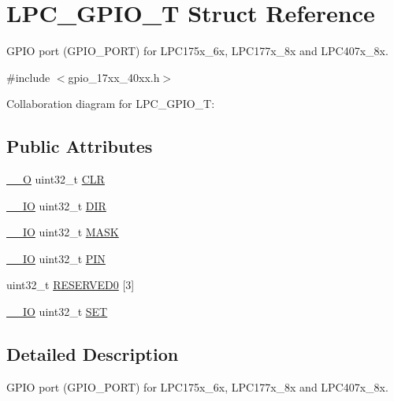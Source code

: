 \hypertarget{structLPC__GPIO__T}{}\section{L\+P\+C\+\_\+\+G\+P\+I\+O\+\_\+T Struct Reference}
\label{structLPC__GPIO__T}


G\+P\+IO port (G\+P\+I\+O\+\_\+\+P\+O\+RT) for L\+P\+C175x\+\_\+6x, L\+P\+C177x\+\_\+8x and L\+P\+C407x\+\_\+8x.  




{\ttfamily \#include $<$gpio\+\_\+17xx\+\_\+40xx.\+h$>$}



Collaboration diagram for L\+P\+C\+\_\+\+G\+P\+I\+O\+\_\+T\+:
\subsection*{Public Attributes}
\begin{DoxyCompactItemize}
\item 
\hyperlink{core__cm3_8h_a7e25d9380f9ef903923964322e71f2f6}{\+\_\+\+\_\+O} uint32\+\_\+t \hyperlink{structLPC__GPIO__T_aba8161f685588a1ca79702207083e6ab}{C\+LR}
\item 
\hyperlink{core__cm3_8h_aec43007d9998a0a0e01faede4133d6be}{\+\_\+\+\_\+\+IO} uint32\+\_\+t \hyperlink{structLPC__GPIO__T_a753957fa7e1c261e57255c1db8d62bb7}{D\+IR}
\item 
\hyperlink{core__cm3_8h_aec43007d9998a0a0e01faede4133d6be}{\+\_\+\+\_\+\+IO} uint32\+\_\+t \hyperlink{structLPC__GPIO__T_a5b0ae096141efd7298aad95ca7b3370e}{M\+A\+SK}
\item 
\hyperlink{core__cm3_8h_aec43007d9998a0a0e01faede4133d6be}{\+\_\+\+\_\+\+IO} uint32\+\_\+t \hyperlink{structLPC__GPIO__T_a1311cc8cf63279d1bdfca5d48c6ccf0a}{P\+IN}
\item 
uint32\+\_\+t \hyperlink{structLPC__GPIO__T_a292d7fd1269aebf1bf53d6df324319a3}{R\+E\+S\+E\+R\+V\+E\+D0} \mbox{[}3\mbox{]}
\item 
\hyperlink{core__cm3_8h_aec43007d9998a0a0e01faede4133d6be}{\+\_\+\+\_\+\+IO} uint32\+\_\+t \hyperlink{structLPC__GPIO__T_aaafd15e2c4eb4665f7a546dfeea25954}{S\+ET}
\end{DoxyCompactItemize}


\subsection{Detailed Description}
G\+P\+IO port (G\+P\+I\+O\+\_\+\+P\+O\+RT) for L\+P\+C175x\+\_\+6x, L\+P\+C177x\+\_\+8x and L\+P\+C407x\+\_\+8x. 

